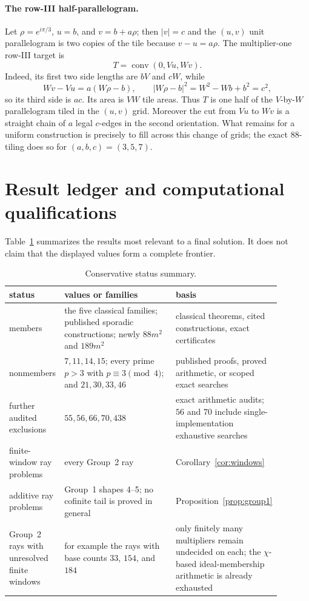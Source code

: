 \documentclass[11pt]{amsart}
\theoremstyle{definition}
\theoremstyle{remark}
\begin{document}
\paragraph{The row-III half-parallelogram.}
Let $\rho=e^{i\pi/3}$, $u=b$, and $v=b+a\rho$; then $|v|=c$ and the
$(u,v)$ unit parallelogram is two copies of the tile because $v-u=a\rho$.
The multiplier-one row-III target is
\[
                    T=\operatorname{conv}(0,Vu,Wv).
\]
Indeed, its first two side lengths are $bV$ and $cW$, while
\[
 Wv-Vu=a(W\rho-b),\qquad
 |W\rho-b|^2=W^2-Wb+b^2=c^2,
\]
so its third side is $ac$.  Its area is $VW$ tile areas.  Thus $T$ is one
half of the $V$-by-$W$ parallelogram tiled in the $(u,v)$ grid.  Moreover the
cut from $Vu$ to $Wv$ is a straight chain of $a$ legal $c$-edges in the
second orientation.  What remains for a uniform construction is precisely
to fill across this change of grids; the exact $88$-tiling does so for
$(a,b,c)=(3,5,7)$.

\clearpage
\section{Result ledger and computational qualifications}\label{app:ledger}

Table~\ref{tab:status} summarizes the results most relevant to a final
solution.  It does not claim that the displayed values form a complete
frontier.

\begin{table}[ht]
\centering
\small
\renewcommand{\arraystretch}{1.13}
\begin{tabular}{@{}>{\raggedright\arraybackslash}p{0.16\linewidth}
>{\raggedright\arraybackslash}p{0.42\linewidth}
>{\raggedright\arraybackslash}p{0.31\linewidth}@{}}
\toprule
status & values or families & basis \\
\midrule
members
& the five classical families; published sporadic constructions; newly
  $88m^2$ and $189m^2$
& classical theorems, cited constructions, exact certificates \\
\addlinespace
nonmembers
& $7,11,14,15$; every prime $p>3$ with $p\equiv3\pmod4$; and
  $21,30,33,46$
& published proofs, proved arithmetic, or scoped exact searches \\
\addlinespace
further audited exclusions
& $55,56,66,70,438$
& exact arithmetic audits; $56$ and $70$ include single-implementation
  exhaustive searches \\
\addlinespace
finite-window ray problems
& every Group~2 ray
& Corollary~\ref{cor:windows} \\
\addlinespace
additive ray problems
& Group~1 shapes 4--5; no cofinite tail is proved in general
& Proposition~\ref{prop:group1} \\
\addlinespace
Group~2 rays with unresolved finite windows
& for example the rays with base counts $33$, $154$, and $184$
& only finitely many multipliers remain undecided on each; the
  $\chi$-based ideal-membership arithmetic is already exhausted \\
\bottomrule
\end{tabular}
\caption{Conservative status summary.}
\label{tab:status}
\end{table}
\end{document}
